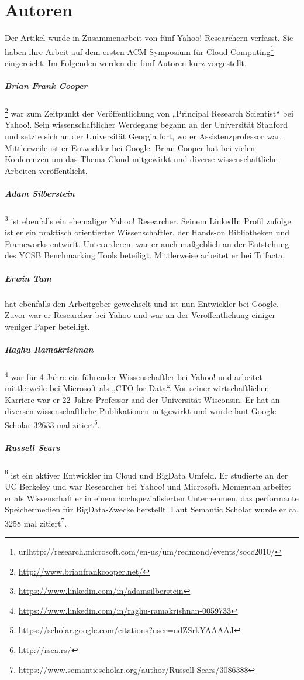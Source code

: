 \section{Autoren}

Der Artikel wurde in Zusammenarbeit von fünf Yahoo! Researchern verfasst. Sie haben ihre Arbeit auf dem ersten ACM Symposium für Cloud Computing\footnote{url{http://research.microsoft.com/en-us/um/redmond/events/socc2010/}} eingereicht. Im Folgenden werden die fünf Autoren kurz vorgestellt.


\subparagraph{Brian Frank Cooper}\footnote{\url{http://www.brianfrankcooper.net/}}
war zum Zeitpunkt der Veröffentlichung von \cite{ycsb10} „Principal Research Scientist“ bei Yahoo!. Sein wissenschaftlicher Werdegang begann an der Universität Stanford und setzte sich an der Universität Georgia fort, wo er Assistenzprofessor war. Mittlerweile ist er Entwickler bei Google. Brian Cooper hat bei vielen Konferenzen um das Thema Cloud mitgewirkt und diverse wissenschaftliche Arbeiten veröffentlicht.

\subparagraph{Adam Silberstein}\footnote{\url{https://www.linkedin.com/in/adamsilberstein}}
ist ebenfalls ein ehemaliger Yahoo! Researcher. Seinem LinkedIn Profil zufolge ist er ein praktisch orientierter Wissenschaftler, der Hands-on Bibliotheken und Frameworks entwirft. Unterarderem war er auch maßgeblich an der Entstehung des YCSB Benchmarking Tools beteiligt. Mittlerweise arbeitet er bei Trifacta.

\subparagraph{Erwin Tam}
hat ebenfalls den Arbeitgeber gewechselt und ist nun Entwickler bei Google. Zuvor war er Researcher bei Yahoo und war an der Veröffentlichung einiger weniger Paper beteiligt. 

\subparagraph{Raghu Ramakrishnan}\footnote{\url{https://www.linkedin.com/in/raghu-ramakrishnan-0059733}}
war für 4 Jahre ein führender Wissenschaftler bei Yahoo! und arbeitet mittlerweile bei Microsoft als „CTO for Data“. Vor seiner wirtschaftlichen Karriere war er 22 Jahre Professor and der Universität Wisconsin. Er hat an diversen wissenschaftliche Publikationen mitgewirkt und wurde laut Google Scholar 32633 mal zitiert\footnote{\url{https://scholar.google.com/citations?user=udZSrkYAAAAJ}}.

\subparagraph{Russell Sears}\footnote{\url{http://rsea.rs/}}
ist ein aktiver Entwickler im Cloud und BigData Umfeld. Er studierte an der UC Berkeley und war Researcher bei Yahoo! und Microsoft. Momentan arbeitet er als Wissenschaftler in einem hochspezialisierten Unternehmen, das performante Speichermedien für BigData-Zwecke herstellt. Laut Semantic Scholar wurde er ca. 3258 mal zitiert\footnote{\url{https://www.semanticscholar.org/author/Russell-Sears/3086388}}.


